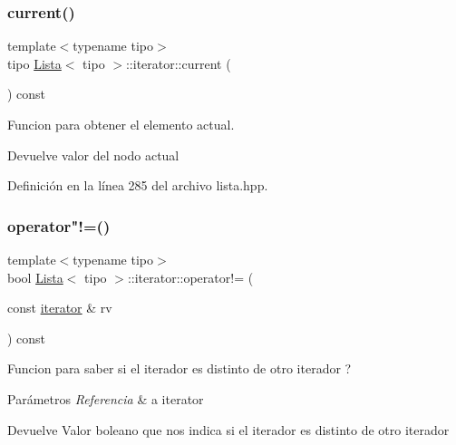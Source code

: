 \subsubsection{\texorpdfstring{current()}{current()}}
{\footnotesize\ttfamily template$<$typename tipo$>$ \\
tipo \hyperlink{classLista}{Lista}$<$ tipo $>$\+::iterator\+::current (\begin{DoxyParamCaption}{ }\end{DoxyParamCaption}) const\hspace{0.3cm}{\ttfamily [inline]}}



Funcion para obtener el elemento actual. 

\begin{DoxyReturn}{Devuelve}
valor del nodo actual 
\end{DoxyReturn}


Definición en la línea 285 del archivo lista.\+hpp.

\mbox{\label{classLista_1_1iterator_a25cd74ab23dd46dd3e9f0769c0264eb9}} 
\subsubsection{\texorpdfstring{operator"!=()}{operator!=()}}
{\footnotesize\ttfamily template$<$typename tipo$>$ \\
bool \hyperlink{classLista}{Lista}$<$ tipo $>$\+::iterator\+::operator!= (\begin{DoxyParamCaption}\item[{const \hyperlink{classLista_1_1iterator}{iterator} \&}]{rv }\end{DoxyParamCaption}) const\hspace{0.3cm}{\ttfamily [inline]}}



Funcion para saber si el iterador es distinto de otro iterador ? 


\begin{DoxyParams}{Parámetros}
{\em Referencia} & a iterator \\
\hline
\end{DoxyParams}
\begin{DoxyReturn}{Devuelve}
Valor boleano que nos indica si el iterador es distinto de otro iterador 
\end{DoxyReturn}


